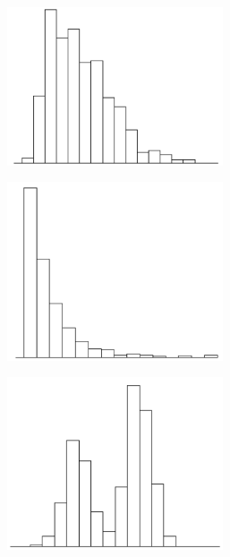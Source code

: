 \begin{figure}[H]
  \vspace*{0.1cm}
  
  \begin{subfigure}{0.3\textwidth}
    \centering
    \includegraphics[width=0.7\textwidth]{assets/visualization_and_extraction/single_feature_example/distr_uni_left.png}
  \end{subfigure}\hspace*{0.01\textwidth}
  \begin{subfigure}{0.3\textwidth}
    \centering
    \includegraphics[width=0.7\textwidth]{assets/visualization_and_extraction/single_feature_example/distr_exp.png}
  \end{subfigure}\hspace*{0.01\textwidth}
  \begin{subfigure}{0.3\textwidth}
    \centering
    \includegraphics[width=0.7\textwidth]{assets/visualization_and_extraction/single_feature_example/distr_multi.png}
  \end{subfigure}


\end{figure}
